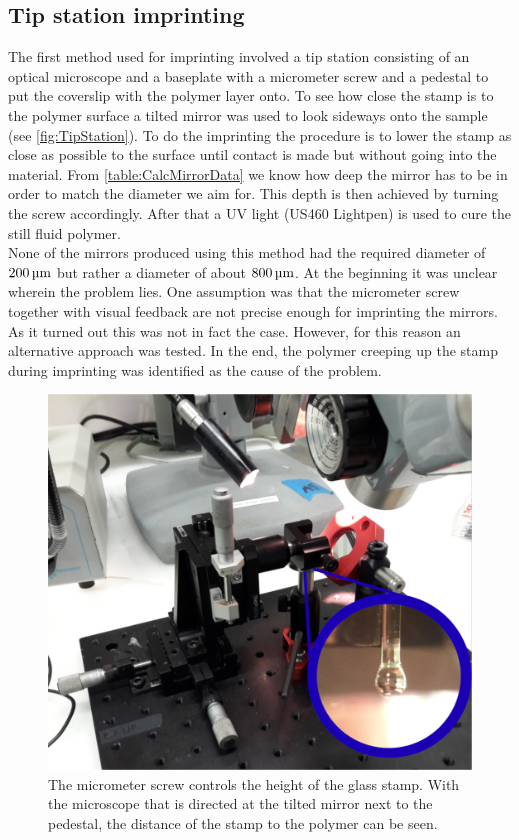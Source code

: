 \subsection{Tip station imprinting}
The first method used for imprinting involved a tip station consisting of an optical microscope and a baseplate with a micrometer screw and a pedestal to put the coverslip with the polymer layer onto. To see how close the stamp is to the polymer surface a tilted mirror was used to look sideways onto the sample (see \autoref{fig:TipStation}). To do the imprinting the procedure is to lower the stamp as close as possible to the surface until contact is made but without going into the material. From \autoref{table:CalcMirrorData} we know how deep the mirror has to be in order to match the diameter we aim for. This depth is then achieved by turning the screw accordingly. After that a UV light (US460 Lightpen) is used to cure the still fluid polymer.\\
None of the mirrors produced using this method had the required diameter of $200\um$ but rather a diameter of about $800\um$.  At the beginning it was unclear wherein the problem lies. One assumption was that the micrometer screw together with visual feedback are not precise enough for imprinting the mirrors. As it turned out this was not in fact the case. However, for this reason an alternative approach was tested. In the end, the polymer creeping up the stamp during imprinting was identified as the cause of the problem.

\begin{figure}[H]
	\includegraphics[scale=1]{source/tip_station_compressed}
	\caption{The micrometer screw controls the height of the glass stamp. With the microscope that is directed at the tilted mirror next to the pedestal, the distance of the stamp to the polymer can be seen.}
	\label{fig:TipStation}
\end{figure}

